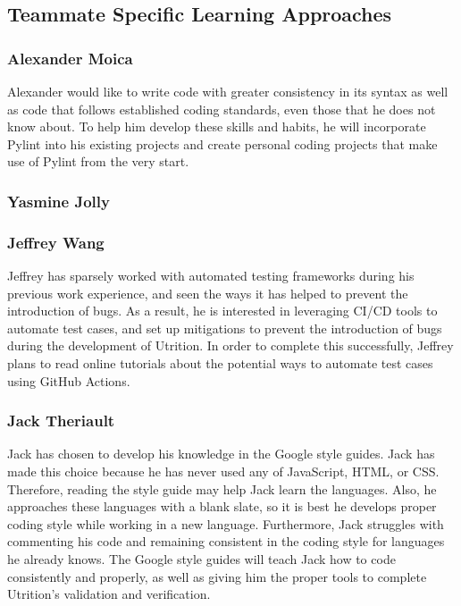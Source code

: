 \documentclass[12pt, titlepage]{article}
\begin{document}
	\subsection*{Teammate Specific Learning Approaches}
	\subsubsection*{Alexander Moica}
	Alexander would like to write code with greater consistency in its syntax as well as code that follows established coding standards, even those that he does not know about. To help him develop these skills and habits, he will incorporate Pylint into his existing projects and create personal coding projects that make use of Pylint from the very start.
	
	\subsubsection*{Yasmine Jolly}
	
	\subsubsection*{Jeffrey Wang}
	
	Jeffrey has sparsely worked with automated testing frameworks during his 
	previous work experience, and seen the ways it has helped to prevent the 
	introduction of bugs. As a result, he is interested in leveraging CI/CD 
	tools to automate test cases, and set up mitigations to prevent the 
	introduction of bugs during the development of Utrition. In order to 
	complete this successfully, Jeffrey plans to read online tutorials about 
	the potential ways to automate test cases using GitHub Actions.
	
	\subsubsection*{Jack Theriault}
	Jack has chosen to develop his knowledge in the Google style guides. Jack has made this choice because he has never used any of JavaScript, HTML, or CSS. Therefore, reading the style guide may help Jack learn the languages. Also, he approaches these languages with a blank slate, so it is best he develops proper coding style  while working in a new language. Furthermore, Jack struggles with commenting his code and remaining consistent in the coding style for languages he already knows. The Google style guides will teach Jack how to code consistently and properly, as well as giving him the proper tools to complete Utrition's validation and verification.
	
\end{document}
